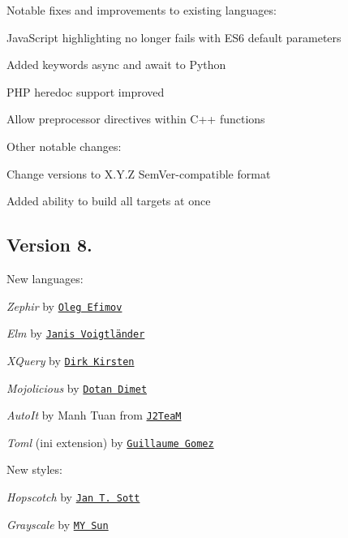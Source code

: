 Notable fixes and improvements to existing languages\+:


\begin{DoxyItemize}
\item Java\+Script highlighting no longer fails with E\+S6 default parameters
\item Added keywords {\ttfamily async} and {\ttfamily await} to Python
\item P\+HP heredoc support improved
\item Allow preprocessor directives within C++ functions
\end{DoxyItemize}

Other notable changes\+:


\begin{DoxyItemize}
\item Change versions to X.\+Y.\+Z Sem\+Ver-\/compatible format
\item Added ability to build all targets at once
\end{DoxyItemize}

\subsection*{Version 8.}

New languages\+:


\begin{DoxyItemize}
\item {\itshape Zephir} by \href{https://github.com/sannis}{\tt Oleg Efimov}
\item {\itshape Elm} by \href{https://github.com/jvoigtlaender}{\tt Janis Voigtländer}
\item {\itshape X\+Query} by \href{https://github.com/dirkk}{\tt Dirk Kirsten}
\item {\itshape Mojolicious} by \href{https://github.com/dotandimet}{\tt Dotan Dimet}
\item {\itshape Auto\+It} by Manh Tuan from \href{https://github.com/J2TeaM}{\tt J2\+TeaM}
\item {\itshape Toml} (ini extension) by \href{https://github.com/GuillaumeGomez}{\tt Guillaume Gomez}
\end{DoxyItemize}

New styles\+:


\begin{DoxyItemize}
\item {\itshape Hopscotch} by \href{https://github.com/idleberg}{\tt Jan T. Sott}
\item {\itshape Grayscale} by \href{https://github.com/simonmysun}{\tt MY Sun}
\end{DoxyItemize}


